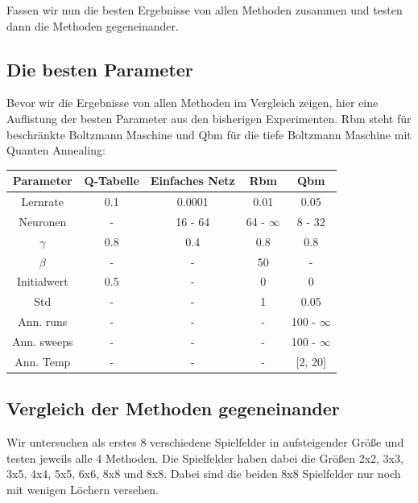 Fassen wir nun die besten Ergebnisse von allen Methoden zusammen und testen dann die Methoden gegeneinander.

\newpage

\subsection{Die besten Parameter}
\label{subsec:best}

Bevor wir die Ergebnisse von allen Methoden im Vergleich zeigen, hier eine Auflistung der besten Parameter aus den bisherigen Experimenten. Rbm steht für beschränkte Boltzmann Maschine und Qbm für die tiefe Boltzmann Maschine mit Quanten Annealing:

\begin{table}[H]
	\centering
	\begin{tabular}{c|c|c|c|c}
	Parameter 				& Q-Tabelle 	& Einfaches Netz 	& Rbm			 	& Qbm			  		\\
	\hline
	Lernrate 					& 0.1 		& 0.0001			& 0.01				& 0.05					\\
	\hline
	Neuronen 					& - 			& 16 - 64			& 64 	- $\infty$			& 8 - 32					\\
	\hline
	$\gamma$ 				& 0.8			& 0.4				& 0.8					& 0.8						\\
	\hline
	$\beta$ 					& - 			& - 				& 50 					& - 						\\
	\hline
	Initialwert 					& 0.5 		& - 				& 0 					& 0						\\
	\hline
	Std			 			& - 			& - 				& 1 					& 0.05					\\
	\hline
	Ann. runs					& - 			& - 				& - 					& 100 - $\infty$				\\
	\hline
	Ann. sweeps				& - 			& - 				& - 					& 100 - $\infty$				\\
	\hline
	Ann. Temp					& - 			& - 				& - 					& [2, 20]					\\
	\end{tabular}
\end{table} 

\subsection{Vergleich der Methoden gegeneinander}
\label{subsec:best_method}

Wir untersuchen als erstes 8 verschiedene Spielfelder in aufsteigender Größe und testen jeweils alle 4 Methoden. Die Spielfelder haben dabei die Größen 2x2, 3x3, 3x5, 4x4, 5x5, 6x6, 8x8 und 8x8. Dabei sind die beiden 8x8 Spielfelder nur noch mit wenigen Löchern versehen.

